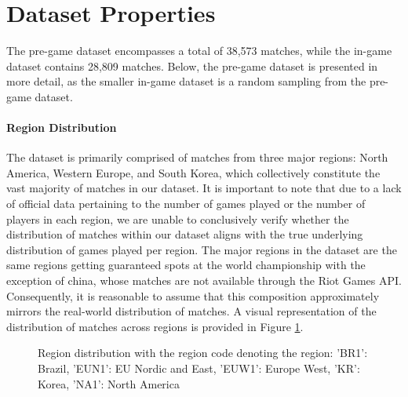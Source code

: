 \documentclass[12pt, a4paper, headinclude, twoside, plainheadsepline, open=right, numbers=noenddot, hidelinks, toc=listof, toc=bibliography]{scrreprt}
\begin{document}
\section{Dataset Properties}
\label{sec:dataprop}

The pre-game dataset encompasses a total of 38,573 matches, while the in-game dataset contains 28,809 matches.
Below, the pre-game dataset is presented in more detail, as the smaller in-game dataset is a random sampling from the pre-game dataset.
\paragraph{Region Distribution}
The dataset is primarily comprised of matches from three major regions: North America, Western Europe, and South Korea, which collectively constitute the vast majority of matches in our dataset. 
It is important to note that due to a lack of official data pertaining to the number of games played or the number of players in each region, we are unable to conclusively verify whether the distribution of matches within our dataset aligns with the true underlying distribution of games played per region.
The major regions in the dataset are the same regions getting guaranteed spots at the world championship \cite{2023LeagueLegends2023} with the exception of china, whose matches are not available through the Riot Games API.
Consequently, it is reasonable to assume that this composition approximately mirrors the real-world distribution of matches.
A visual representation of the distribution of matches across regions is provided in Figure \ref{fig:platformId}.


\begin{figure}[ht]

\caption{Region distribution with the region code denoting the region: 'BR1': Brazil, 'EUN1': EU Nordic and East, 'EUW1': Europe West, 'KR': Korea, 'NA1': North America}
\label{fig:platformId}
\end{figure}
\end{document}
